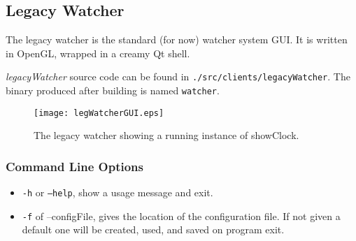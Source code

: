 \subsection{Legacy Watcher}
\label{LegacyWatcher}

The legacy watcher is the standard (for now) watcher system GUI. It is written in OpenGL, wrapped in a creamy Qt shell. 

{\it legacyWatcher} source code can be found in {\tt .\slash src\slash clients\slash legacyWatcher}. The binary produced after building is 
named {\tt watcher}. 

\begin{figure}[htb]
\centering
\texttt{[image: legWatcherGUI.eps]}
\caption{The legacy watcher showing a running instance of showClock.}
\label{fig:LegacyWatcherClock}
\end{figure}

\subsubsection{Command Line Options}
\begin{itemize}
\item {\tt -h} or {\tt --help}, show a usage message and exit. 
\item {\tt -f} of {--configFile}, gives the location of the configuration file. If not given a default one will be created, used, and saved on program exit.
\end{itemize}

